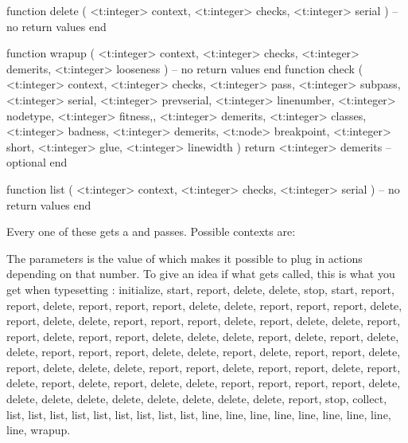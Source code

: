 \starttyping[option=LUA]
function delete (
    <t:integer> context,
    <t:integer> checks,
    <t:integer> serial
)
    -- no return values
end
\stoptyping

\starttyping[option=LUA]
function wrapup (
    <t:integer> context,
    <t:integer> checks,
    <t:integer> demerits,
    <t:integer> looseness
)
    -- no return values
end
\stoptyping
\starttyping[option=LUA]
function check (
    <t:integer> context,
    <t:integer> checks,
    <t:integer> pass,
    <t:integer> subpass,
    <t:integer> serial,
    <t:integer> prevserial,
    <t:integer> linenumber,
    <t:integer> nodetype,
    <t:integer> fitness,,
    <t:integer> demerits,
    <t:integer> classes,
    <t:integer> badness,
    <t:integer> demerits,
    <t:node>    breakpoint,
    <t:integer> short,
    <t:integer> glue,
    <t:integer> linewidth
)
    return <t:integer> demerits  -- optional
end
\stoptyping

\starttyping[option=LUA]
function list (
    <t:integer> context,
    <t:integer> checks,
    <t:integer> serial
)
    -- no return values
end
\stoptyping

Every one of these gets a  and  passes. Possible
contexts are:

\startfourrows
{}
\stopfourrows

The  parameters is the value of \type {\linebreakchecks} which
makes it possible to plug in actions depending on that number. To give an idea if
what gets called, this is what you get when typesetting :
initialize, start, report, delete, delete, stop, start, report, report, delete,
report, report, report, delete, delete, report, report, report, delete, report,
delete, delete, report, report, report, delete, report, delete, delete, report,
report, delete, report, report, delete, delete, delete, report, delete, report,
delete, delete, report, report, report, delete, delete, report, delete, report,
report, delete, report, delete, delete, delete, report, report, delete, report,
report, delete, report, delete, report, delete, report, delete, delete, report,
report, report, report, delete, delete, delete, delete, delete, delete, delete,
delete, delete, report, stop, collect, list, list, list, list, list, list, list,
list, list, line, line, line, line, line, line, line, line, line, wrapup.

\stopsubsection

\startsubsection[title=show_build]

